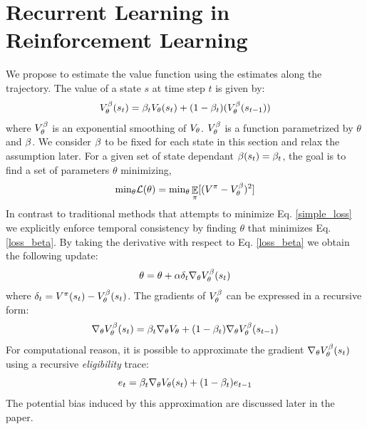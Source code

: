\section{Recurrent Learning in Reinforcement Learning}
\label{RLRL}
We propose to estimate the value function using the estimates along the trajectory. The value of a state $s$ at time step $t$ is given by:
\begin{equation}
\label{value}
\begin{split}
    V^{\beta}_{\theta}(s_t) &= \beta_t V_{\theta}(s_t) + (1 - \beta_t) (V^{\beta}_{\theta}(s_{t-1})) \\ 
\end{split}
\end{equation}
where $V^{\beta}_{\theta}$ is an exponential smoothing of $V_{\theta}$. $V^{\beta}_{\theta}$ is a function parametrized by $\theta$ and $\beta$. We consider $\beta$ to be fixed for each state in this section and relax the assumption later. For a given set of state dependant $\beta(s_t) = \beta_t$, the goal is to find a set of parameters $\theta$ minimizing,
\begin{equation}\label{loss_beta}
    \text{min}_{\theta} \mathcal{L}(\theta) = \text{min}_{\theta} \mathop{\mathbb{E}}_{\pi} [(V^{\pi} - V^{\beta}_{\theta})^2]
\end{equation}
In contrast to traditional methods that attempts to minimize Eq. \ref{simple_loss} we explicitly enforce temporal consistency by finding $\theta$ that minimizes Eq. \ref{loss_beta}.
By taking the derivative with respect to Eq. \ref{loss_beta} we obtain the following update:
\begin{equation}
\begin{split}
    \theta &= \theta + \alpha \delta_t  \nabla_{\theta} V^{\beta}_{\theta} (s_t) \\
\end{split}
\end{equation}
where $\delta_t = V^{\pi}(s_t) - V^{\beta}_{\theta}(s_t)$.
 The gradients of $V^{\beta}_{\theta}$ can be expressed in a recursive form:
\begin{equation}
    \nabla_{\theta} V^{\beta}_{\theta} (s_t) = \beta_t \nabla_{\theta} V_{\theta} + (1-\beta_t) \nabla_{\theta} V^{\beta}_{\theta} (s_{t-1})
\end{equation}
For computational reason, it is possible to approximate the gradient $\nabla_{\theta}V^{\beta}_{\theta} (s_{t})$ using a recursive \emph{eligibility} trace:
\begin{equation}
\label{trace}
    e_t = \beta_t \nabla_{\theta} V_{\theta} (s_t) + (1-\beta_t) e_{t-1}
\end{equation} 
The potential bias induced by this approximation are discussed later in the paper.
